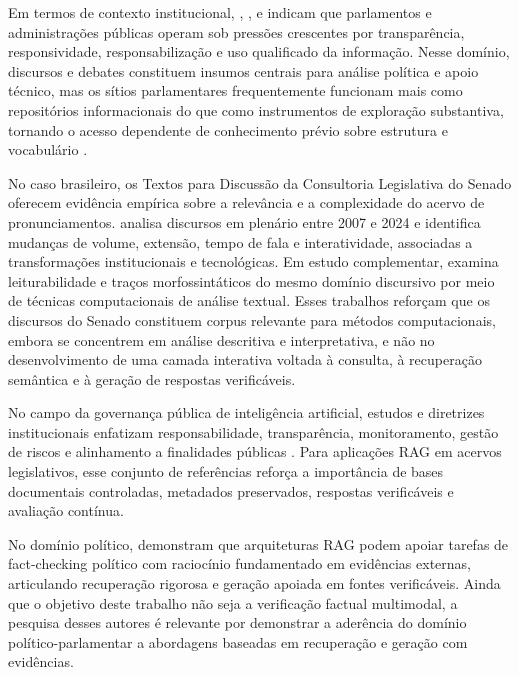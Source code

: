 Em termos de contexto institucional, \textcite{un2015responsiveGovernance}, \textcite{ipu2024aiParliaments}, \textcite{wfd2023guidelinesAiParliaments} e \textcite{geunis2023parliamentaryMonitoring} indicam que parlamentos e administrações públicas operam sob pressões crescentes por transparência, responsividade, responsabilização e uso qualificado da informação. Nesse domínio, discursos e debates constituem insumos centrais para análise política e apoio técnico, mas os sítios parlamentares frequentemente funcionam mais como repositórios informacionais do que como instrumentos de exploração substantiva, tornando o acesso dependente de conhecimento prévio sobre estrutura e vocabulário \parencite{skubicFiser2024discourseReview,bandeiraBernardes2016information}.

No caso brasileiro, os Textos para Discussão da Consultoria Legislativa do Senado oferecem evidência empírica sobre a relevância e a complexidade do acervo de pronunciamentos. \textcite{blanco2025plenarioPalanqueEstudio} analisa discursos em plenário entre 2007 e 2024 e identifica mudanças de volume, extensão, tempo de fala e interatividade, associadas a transformações institucionais e tecnológicas. Em estudo complementar, \textcite{blanco2026letrasGraudas} examina leiturabilidade e traços morfossintáticos do mesmo domínio discursivo por meio de técnicas computacionais de análise textual. Esses trabalhos reforçam que os discursos do Senado constituem corpus relevante para métodos computacionais, embora se concentrem em análise descritiva e interpretativa, e não no desenvolvimento de uma camada interativa voltada à consulta, à recuperação semântica e à geração de respostas verificáveis.

No campo da governança pública de inteligência artificial, estudos e diretrizes institucionais enfatizam responsabilidade, transparência, monitoramento, gestão de riscos e alinhamento a finalidades públicas \parencite{deAlmeidaSantos2025aiGovernance,ipu2024aiParliaments,wfd2023guidelinesAiParliaments}. Para aplicações RAG em acervos legislativos, esse conjunto de referências reforça a importância de bases documentais controladas, metadados preservados, respostas verificáveis e avaliação contínua.

No domínio político, \textcite{khaliq2024ragar} demonstram que arquiteturas RAG podem apoiar tarefas de fact-checking político com raciocínio fundamentado em evidências externas, articulando recuperação rigorosa e geração apoiada em fontes verificáveis. Ainda que o objetivo deste trabalho não seja a verificação factual multimodal, a pesquisa desses autores é relevante por demonstrar a aderência do domínio político-parlamentar a abordagens baseadas em recuperação e geração com evidências.

